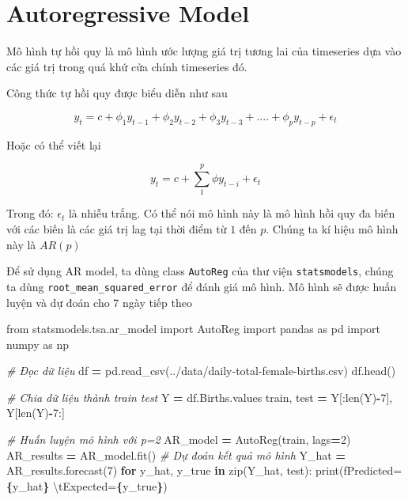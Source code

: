 \documentclass[
]{book}
\newenvironment{Shaded}{\begin{snugshade}}{\end{snugshade}}
\newcommand{\BuiltInTok}[1]{#1}
\newcommand{\CharTok}[1]{\textcolor[rgb]{0.31,0.60,0.02}{#1}}
\newcommand{\CommentTok}[1]{\textcolor[rgb]{0.56,0.35,0.01}{\textit{#1}}}
\newcommand{\ControlFlowTok}[1]{\textcolor[rgb]{0.13,0.29,0.53}{\textbf{#1}}}
\newcommand{\DecValTok}[1]{\textcolor[rgb]{0.00,0.00,0.81}{#1}}
\newcommand{\ImportTok}[1]{#1}
\newcommand{\KeywordTok}[1]{\textcolor[rgb]{0.13,0.29,0.53}{\textbf{#1}}}
\newcommand{\NormalTok}[1]{#1}
\newcommand{\OperatorTok}[1]{\textcolor[rgb]{0.81,0.36,0.00}{\textbf{#1}}}
\newcommand{\SpecialCharTok}[1]{\textcolor[rgb]{0.81,0.36,0.00}{\textbf{#1}}}
\newcommand{\SpecialStringTok}[1]{\textcolor[rgb]{0.31,0.60,0.02}{#1}}
\newcommand{\StringTok}[1]{\textcolor[rgb]{0.31,0.60,0.02}{#1}}
\begin{document}
\section{Autoregressive Model}\label{autoregressive-model}

Mô hình tự hồi quy là mô hình ước lượng giá trị tương lai của timeseries dựa vào các giá trị trong quá khứ cửa chính timeseries đó.

Công thức tự hồi quy được biểu diễn như sau

\[
y_t = c + \phi_1 y_{t-1} + \phi_2 y_{t-2} + \phi_3 y_{t-3} + .... + \phi_p y_{t-p} + \epsilon_t
\]

Hoặc có thể viết lại

\[
y_t = c + \sum^{p}_{1}\phi y_{t-i} + \epsilon_t
\]

Trong đó: \(\epsilon_t\) là nhiễu trắng. Có thể nói mô hình này là mô hình hồi quy đa biến với các biến là các giá trị lag tại thời điểm từ \(1\) đến \(p\). Chúng ta kí hiệu mô hình này là \(AR(p)\)

Để sử dụng AR model, ta dùng class \texttt{AutoReg} của thư viện \texttt{statsmodels}, chúng ta dùng \texttt{root\_mean\_squared\_error} để đánh giá mô hình. Mô hình sẽ được huấn luyện và dự đoán cho 7 ngày tiếp theo

\begin{Shaded}
\begin{Highlighting}[]
\ImportTok{from}\NormalTok{ statsmodels.tsa.ar\_model }\ImportTok{import}\NormalTok{ AutoReg}
\ImportTok{import}\NormalTok{ pandas }\ImportTok{as}\NormalTok{ pd }
\ImportTok{import}\NormalTok{ numpy }\ImportTok{as}\NormalTok{ np}

\CommentTok{\# Đọc dữ liệu}
\NormalTok{df }\OperatorTok{=}\NormalTok{ pd.read\_csv(}\StringTok{\textquotesingle{}../data/daily{-}total{-}female{-}births.csv\textquotesingle{}}\NormalTok{)}
\NormalTok{df.head()}

\CommentTok{\# Chia dữ liệu thành train test}
\NormalTok{Y }\OperatorTok{=}\NormalTok{ df.Births.values}
\NormalTok{train, test }\OperatorTok{=}\NormalTok{ Y[:}\BuiltInTok{len}\NormalTok{(Y)}\OperatorTok{{-}}\DecValTok{7}\NormalTok{], Y[}\BuiltInTok{len}\NormalTok{(Y)}\OperatorTok{{-}}\DecValTok{7}\NormalTok{:]}

\CommentTok{\# Huấn luyện mô hình với p=2}
\NormalTok{AR\_model }\OperatorTok{=}\NormalTok{ AutoReg(train, lags}\OperatorTok{=}\DecValTok{2}\NormalTok{)}
\NormalTok{AR\_results }\OperatorTok{=}\NormalTok{ AR\_model.fit()}
\CommentTok{\# Dự đoán kết quả mô hình}
\NormalTok{Y\_hat }\OperatorTok{=}\NormalTok{ AR\_results.forecast(}\DecValTok{7}\NormalTok{)}
\ControlFlowTok{for}\NormalTok{ y\_hat, y\_true }\KeywordTok{in} \BuiltInTok{zip}\NormalTok{(Y\_hat, test):}
    \BuiltInTok{print}\NormalTok{(}\SpecialStringTok{f\textquotesingle{}Predicted=}\SpecialCharTok{\{}\NormalTok{y\_hat}\SpecialCharTok{\}}\SpecialStringTok{ }\CharTok{\textbackslash{}t}\SpecialStringTok{Expected=}\SpecialCharTok{\{}\NormalTok{y\_true}\SpecialCharTok{\}}\SpecialStringTok{\textquotesingle{}}\NormalTok{)}
\end{Highlighting}
\end{Shaded}
\end{document}
